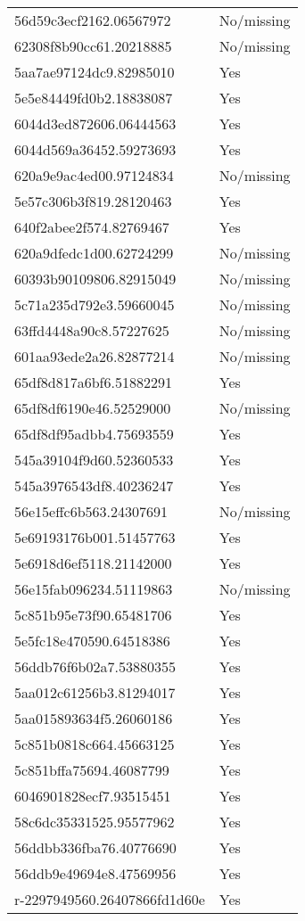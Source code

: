 \begin{tabular}{ll}
56d59c3ecf2162.06567972 & No/missing \\
62308f8b90cc61.20218885 & No/missing \\
5aa7ae97124dc9.82985010 & Yes \\
5e5e84449fd0b2.18838087 & Yes \\
6044d3ed872606.06444563 & Yes \\
6044d569a36452.59273693 & Yes \\
620a9e9ac4ed00.97124834 & No/missing \\
5e57c306b3f819.28120463 & Yes \\
640f2abee2f574.82769467 & Yes \\
620a9dfedc1d00.62724299 & No/missing \\
60393b90109806.82915049 & No/missing \\
5c71a235d792e3.59660045 & No/missing \\
63ffd4448a90c8.57227625 & No/missing \\
601aa93ede2a26.82877214 & No/missing \\
65df8d817a6bf6.51882291 & Yes \\
65df8df6190e46.52529000 & No/missing \\
65df8df95adbb4.75693559 & Yes \\
545a39104f9d60.52360533 & Yes \\
545a3976543df8.40236247 & Yes \\
56e15effc6b563.24307691 & No/missing \\
5e69193176b001.51457763 & Yes \\
5e6918d6ef5118.21142000 & Yes \\
56e15fab096234.51119863 & No/missing \\
5c851b95e73f90.65481706 & Yes \\
5e5fc18e470590.64518386 & Yes \\
56ddb76f6b02a7.53880355 & Yes \\
5aa012c61256b3.81294017 & Yes \\
5aa015893634f5.26060186 & Yes \\
5c851b0818c664.45663125 & Yes \\
5c851bffa75694.46087799 & Yes \\
6046901828ecf7.93515451 & Yes \\
58c6dc35331525.95577962 & Yes \\
56ddbb336fba76.40776690 & Yes \\
56ddb9e49694e8.47569956 & Yes \\
r-2297949560.26407866fd1d60e & Yes \\

\end{tabular}
